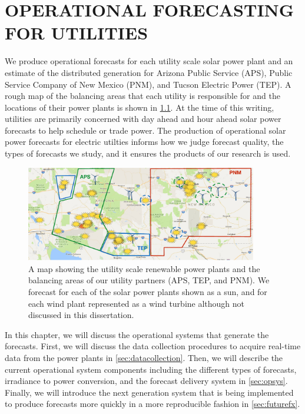 \chapter{OPERATIONAL FORECASTING FOR UTILITIES}
\label{chap:operations}

We produce operational forecasts for each utility scale solar power
plant and an estimate of the distributed generation for Arizona Public
Service (APS), Public Service Company of New Mexico (PNM), and Tucson
Electric Power (TEP).
A rough map of the balancing areas that each utility is responsible
for and the locations of their power plants is shown in
\cref{fig:utilitymap}.
At the time of this writing, utilities are primarily concerned with
day ahead and hour ahead solar power forecasts to help schedule or
trade power.
The production of operational solar power forecasts for electric
utilties informs how we judge forecast quality, the types of
forecasts we study, and it ensures the products of our research is
used.

\begin{figure}[htb]
\centering
\includegraphics[width=0.9\textwidth]{figs/fxmap.pdf}
\caption[Map of utility scale renewable power plants]{A map showing
the utility scale renewable power plants and the balancing areas of
our utility partners (APS, TEP, and PNM). We forecast for each of the
solar power plants shown as a sun, and for each wind plant represented
as a wind turbine although not discussed in this dissertation.}
\label{fig:utilitymap}
\end{figure}

In this chapter, we will discuss the operational systems that generate
the forecasts.
First, we will discuss the data collection procedures to acquire
real-time data from the power plants in \cref{sec:datacollection}.
Then, we will describe the current operational system components
including the different types of forecasts, irradiance to power
conversion, and the forecast delivery system in \cref{sec:opsys}.
Finally, we will introduce the next generation system that is being
implemented to produce forecasts more quickly in a more reproducible
fashion in \cref{sec:futurefx}.

